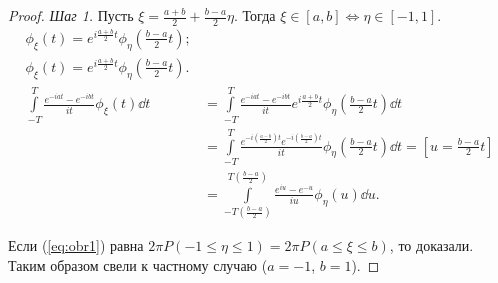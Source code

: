  \begin{proof}
 \textsl{Шаг 1.} Пусть $\xi = \frac{a+b}{2} + \frac{b - a}{2}\eta$.
     Тогда $\xi\in [a, b] \iff\eta\in [-1, 1]$.
    \begin{align*}
    \phi_\xi(t) = e^{i\frac{a + b}{2}t}\phi_\eta(\frac{b-a}{2}t);\\
    \phi_\xi(t) = e^{i\frac{a + b}{2}t}\phi_\eta(\frac{b-a}{2}t).\\
        \int\limits_{-T}^T \frac{e^{-iat} -e^{-ibt}}{it}\phi_\xi(t)\dd t &= \int\limits_{-T}^T \frac{e^{-iat} -e^{-ibt}}{it}e^{i\frac{a + b}{2}t}\phi_\eta(\frac{b-a}{2}t)\dd t \\&=\int\limits_{-T}^T \frac{e^{-i(\frac{a-b}{2})t}e^{-i(\frac{b-a}{2})t}}{it}\phi_\eta(\frac{b-a}{2}t)\dd t = [u = \frac{b-a}{2}t] \\ &= \int\limits_{-T(\frac{b-a}{2})}^{T(\frac{b -a}{2})}\frac{e^{iu} - e^{-u}}{iu}\phi_\eta(u)\dd u. \label{eq:obr1}\tag{$*$}
    \end{align*}
   
Если (\ref{eq:obr1}) равна $2\pi P(-1\le \eta \le 1) = 2\pi P(a\le \xi\le b)$, то доказали. Таким образом свели к частному случаю ($a=-1$, $b=1$).



\end{proof}
